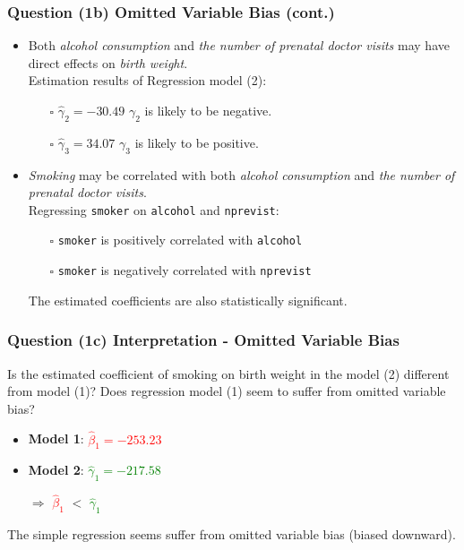 \documentclass[11pt, xcolor=x11names,compress]{beamer}
\begin{document}
\begin{frame}[fragile,t]
\frametitle{Question (1b) Omitted Variable Bias (cont.)} 
\linespread{1.3}
\begin{itemize}
    \item Both \textit{alcohol consumption} and \textit{the number of prenatal doctor visits} may have direct effects on \textit{birth weight}.\\
    Estimation results of Regression model (2):
    \begin{itemize}
        \item [$\square$] $\hat{\gamma}_2 = -30.49$ \Rightarrow $\gamma_2$ is likely to be negative.
        \item [$\square$] $\hat{\gamma}_3 = 34.07$  \Rightarrow $\gamma_3$ is likely to be positive.
    \end{itemize}
    \item \textit{Smoking} may be correlated with both \textit{alcohol consumption} and \textit{the number of prenatal doctor visits}.\\ 
    Regressing \texttt{smoker} on \texttt{alcohol} and \texttt{nprevist}: 
    \begin{itemize}
        \item [$\square$] \texttt{smoker} is positively correlated with \texttt{alcohol}
         \item [$\square$] \texttt{smoker} is negatively correlated with \texttt{nprevist}    
    \end{itemize}
    The estimated coefficients are also statistically significant.
\end{itemize}
\end{frame}

\begin{frame}[fragile,t]
\frametitle{Question (1c) Interpretation - Omitted Variable Bias} 
Is the estimated coefficient of smoking on birth weight in the
model (2) different from model (1)? Does regression model (1)
seem to suffer from omitted variable bias?\\
\pause
\vspace{3mm}
\begin{itemize}
    \item \textbf{Model 1}: \textcolor{red}{$\hat{\beta}_{1} = -253.23$}
    \item \textbf{Model 2}: \textcolor{green}{$\hat{\gamma}_{1} = -217.58$}\\
    
    \vspace{2mm}
    
    \hspace{12mm} $\Longrightarrow$ \textcolor{red}{$\hat{\beta}_{1}$} $<$
    \textcolor{green}{$\hat{\gamma}_{1}$}
\end{itemize}
The simple regression seems suffer from omitted variable bias (biased downward).
\end{frame}
\end{document}
